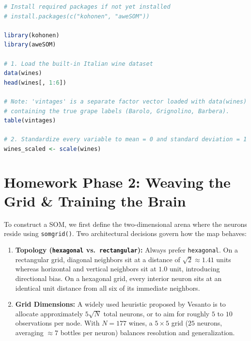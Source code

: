 \documentclass[11pt]{article}
\begin{document}
\begin{lstlisting}[language=R]
# Install required packages if not yet installed
# install.packages(c("kohonen", "aweSOM"))

library(kohonen)
library(aweSOM)

# 1. Load the built-in Italian wine dataset
data(wines)
head(wines[, 1:6])

# Note: 'vintages' is a separate factor vector loaded with data(wines)
# containing the true grape labels (Barolo, Grignolino, Barbera).
table(vintages)

# 2. Standardize every variable to mean = 0 and standard deviation = 1
wines_scaled <- scale(wines)
\end{lstlisting}

\section{Homework Phase 2: Weaving the Grid \& Training the Brain}
\label{sec:train}

To construct a SOM, we first define the two-dimensional arena where the neurons reside using \texttt{somgrid()}. Two architectural decisions govern how the map behaves:

\begin{enumerate}
  \item \textbf{Topology (\texttt{hexagonal} vs.\ \texttt{rectangular}):} Always prefer \texttt{hexagonal}. On a rectangular grid, diagonal neighbors sit at a distance of $\sqrt{2} \approx 1.41$ units whereas horizontal and vertical neighbors sit at $1.0$ unit, introducing directional bias. On a hexagonal grid, every interior neuron sits at an identical unit distance from all six of its immediate neighbors.
  \item \textbf{Grid Dimensions:} A widely used heuristic proposed by Vesanto is to allocate approximately $5\sqrt{N}$ total neurons, or to aim for roughly $5$ to $10$ observations per node. With $N = 177$ wines, a $5 \times 5$ grid ($25$ neurons, averaging $\approx 7$ bottles per neuron) balances resolution and generalization.
\end{enumerate}
\end{document}

